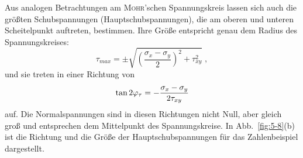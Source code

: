 Aus analogen Betrachtungen am \textsc{Mohr}'schen Spannungskreis lassen sich auch die größten Schubspannungen (Hauptschubspannungen), die am oberen und unteren Scheitelpunkt auftreten, bestimmen.
Ihre Größe entspricht genau dem Radius des Spannungskreises:
%
\begin{equation}
\tau_{max}=\pm\sqrt{\left(\dfrac{\sigma_x-\sigma_y}{2}\right)^2+\tau_{xy}^2} \; ,
\label{eq:5-7}
\end{equation}
%
und sie treten in einer Richtung von 
%
\begin{equation}
\tan 2\varphi_\tau=-\dfrac{\sigma_x-\sigma_y}{2\tau_{xy}}
\label{eq:5-8}
\end{equation}
%
auf.
Die Normalspannungen sind in diesen Richtungen nicht Null, aber gleich groß und entsprechen dem Mittelpunkt des Spannungskreise.
In Abb.~\ref{fig:5-8}(b) ist die Richtung und die Größe der Hauptschubspannungen für das Zahlenbeispiel dargestellt.


